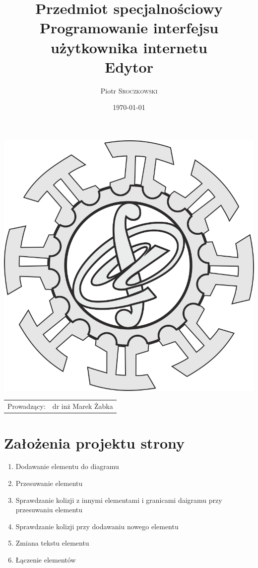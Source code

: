 \documentclass{article}
\title{Przedmiot specjalnościowy\\ Programowanie interfejsu użytkownika internetu\\ Edytor } %
\author{Piotr \textsc{Sroczkowski}} %
\date{\today} %
\begin{document}
\maketitle %


\begin{center}
\includegraphics{logo.png}
\begin{tabular}{l r}
Prowadzący: & dr inż Marek Żabka %
\end{tabular}
\end{center}

\pagebreak




\section{Założenia projektu strony}
\begin{enumerate}
    \item Dodawanie elementu do diagramu
    \item Przesuwanie elementu
    \item Sprawdzanie kolizji z innymi elementami i granicami daigramu przy przesuwaniu elementu
    \item Sprawdzanie kolizji przy dodawaniu nowego elementu
    \item Zmiana tekstu elementu
    \item Łączenie elementów
\end{enumerate}
\end{document}
